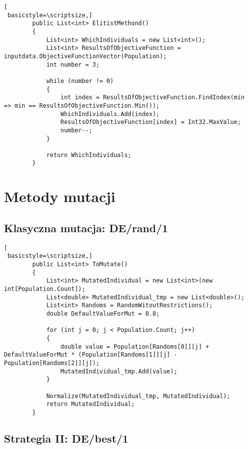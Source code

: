 \begin{lstlisting}[
 basicstyle=\scriptsize,]
        public List<int> ElitistMethond()
        {
            List<int> WhichIndividuals = new List<int>();
            List<int> ResultsOfObjectiveFunction = inputdata.ObjectiveFunctionVector(Population);
            int number = 3;

            while (number != 0)
            {
                int index = ResultsOfObjectiveFunction.FindIndex(min => min == ResultsOfObjectiveFunction.Min());
                WhichIndividuals.Add(index);
                ResultsOfObjectiveFunction[index] = Int32.MaxValue;
                number--;
            }

            return WhichIndividuals;
        }
\end{lstlisting}

\section*{Metody mutacji}\label{repomutacji}

\subsection*{Klasyczna mutacja: DE/rand/1}

\begin{lstlisting}[
 basicstyle=\scriptsize,]
        public List<int> ToMutate()
        {
            List<int> MutatedIndividual = new List<int>(new int[Population.Count]);
            List<double> MutatedIndividual_tmp = new List<double>();
            List<int> Randoms = RandomWitoutRestrictions();
            double DefaultValueForMut = 0.8;

            for (int j = 0; j < Population.Count; j++)
            {
                double value = Population[Randoms[0]][j] + DefaultValueForMut * (Population[Randoms[1]][j] - Population[Randoms[2]][j]);
                MutatedIndividual_tmp.Add(value);
            }

            Normalize(MutatedIndividual_tmp, MutatedIndividual);
            return MutatedIndividual;
        }
\end{lstlisting}

\subsection*{Strategia II: DE/best/1}

